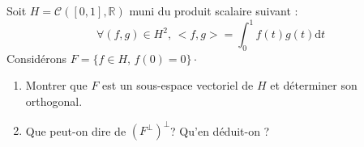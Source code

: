 \documentclass[a4paper,twoside,french,11pt]{VcCours}
\newcommand{\dt}{\text{d}t}
\begin{document}

\begin{Exercice}[$\bigstar$]{} Soit $H= \mathcal{C}([0,1],\mathbb{R})$ muni du produit scalaire suivant :
$$ \forall (f,g) \in H^2, \, <f,g> = \int_{0}^1 f(t) g(t) \dt $$
Considérons $F= \lbrace f \in H, \, f(0)=0 \rbrace \cdot$

\begin{enumerate}
\item Montrer que $F$ est un sous-espace vectoriel de $H$ et déterminer son orthogonal.
\item Que peut-on dire de $(F^{\perp})^{\perp}$? Qu'en déduit-on ?
\end{enumerate}
\end{Exercice}
\end{document}

